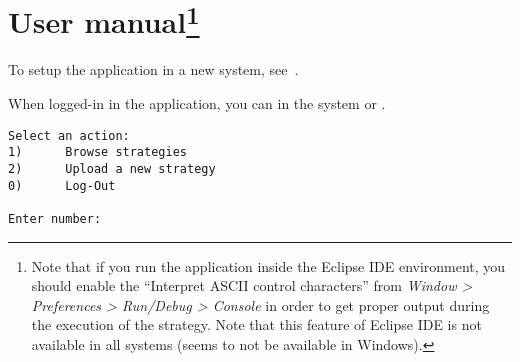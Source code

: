 \chapter[User manual]{User manual\footnote{Note that if you run the
application inside the Eclipse IDE environment, you should enable the
``Interpret ASCII control characters'' from \textit{Window > Preferences >
Run/Debug > Console} in order to get proper output during the execution of the
strategy. Note that this feature of Eclipse IDE is not available in all systems
(seems to not be available in Windows).}}\label{ch:manual}

To setup the application in a new system, see~.



When logged-in in the application, you can  in the system or .

\begin{verbatim}
Select an action: 
1)      Browse strategies
2)      Upload a new strategy
0)      Log-Out

Enter number:
\end{verbatim}




